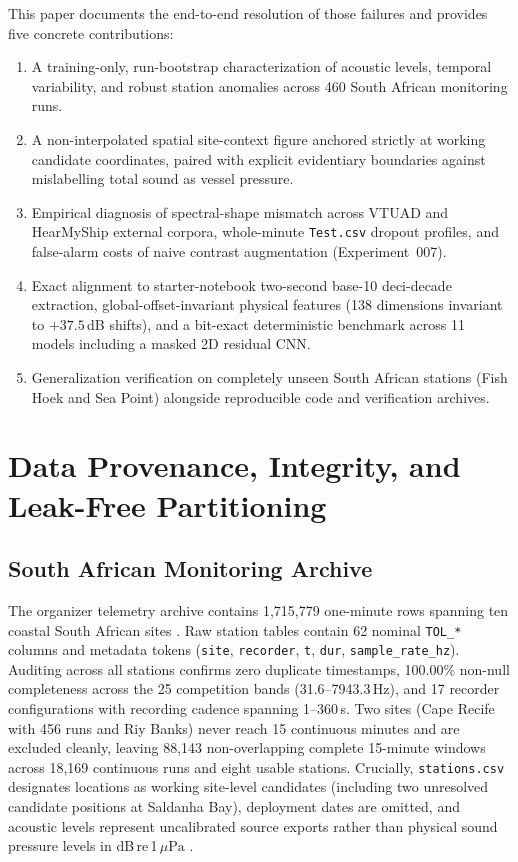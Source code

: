 \documentclass[10pt,a4paper]{article}
\begin{document}
This paper documents the end-to-end resolution of those failures and provides five concrete contributions:
\begin{enumerate}
    \item A training-only, run-bootstrap characterization of acoustic levels, temporal variability, and robust station anomalies across 460 South African monitoring runs.
    \item A non-interpolated spatial site-context figure anchored strictly at working candidate coordinates, paired with explicit evidentiary boundaries against mislabelling total sound as vessel pressure.
    \item Empirical diagnosis of spectral-shape mismatch across VTUAD and HearMyShip external corpora, whole-minute \texttt{Test.csv} dropout profiles, and false-alarm costs of naive contrast augmentation (Experiment~007).
    \item Exact alignment to starter-notebook two-second base-10 deci-decade extraction, global-offset-invariant physical features (138 dimensions invariant to $+37.5$\,dB shifts), and a bit-exact deterministic benchmark across 11 models including a masked 2D residual CNN.
    \item Generalization verification on completely unseen South African stations (Fish Hoek and Sea Point) alongside reproducible code and verification archives.
\end{enumerate}

\section{Data Provenance, Integrity, and Leak-Free Partitioning}

\subsection{South African Monitoring Archive}
The organizer telemetry archive contains 1,715,779 one-minute rows spanning ten coastal South African sites \parencite{zindi2026challenge}. Raw station tables contain 62 nominal \texttt{TOL\_*} columns and metadata tokens (\texttt{site}, \texttt{recorder}, \texttt{t}, \texttt{dur}, \texttt{sample\_rate\_hz}). Auditing across all stations confirms zero duplicate timestamps, 100.00\% non-null completeness across the 25 competition bands (31.6--7943.3\,Hz), and 17 recorder configurations with recording cadence spanning 1--360\,s. Two sites (Cape Recife with 456 runs and Riy Banks) never reach 15 continuous minutes and are excluded cleanly, leaving 88,143 non-overlapping complete 15-minute windows across 18,169 continuous runs and eight usable stations. Crucially, \texttt{stations.csv} designates locations as working site-level candidates (including two unresolved candidate positions at Saldanha Bay), deployment dates are omitted, and acoustic levels represent uncalibrated source exports rather than physical sound pressure levels in dB\,re\,1\,$\mu\text{Pa}$ \parencite{iso2017underwater}.
\end{document}
